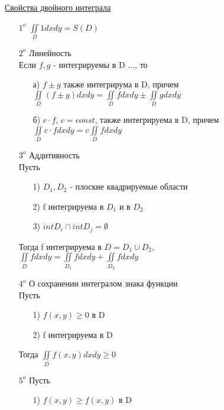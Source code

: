 \underline{Свойства двойного интеграла} \\
\begin{enumerate}
\item[$1^o$]
$\iint\limits_{D} 1 dxdy = S(D)$

\item[$2^o$] 
Линейность \\
Если $f,g$ - интегрируемы в D ..., то
	\begin{enumerate}
	\item[а)] 
	$f \pm g$ также интегрирума в D, причем \\
	$\iint\limits_{D} (f \pm g) dxdy = \iint\limits_{D} fdxdy \pm \iint\limits_{D} gdxdy$
	
	\item[б)]
	$c \cdot f$, $c = const$, также интегрируема в D, причем \\
	$\iint\limits_{D} c \cdot f dxdy = c \iint\limits_{D} f dxdy$
	\end{enumerate}
	
\item[$3^o$] 
Аддитивность \\
Пусть 
	\begin{enumerate}
	\item[1)] 
	$D_1, D_2$ - плоские квадрируемые области
	
	\item[2)]
	f интегрируема в $D_1$ и в $D_2$
	
	\item[3)]
	$int D_i \cap int D_j = \emptyset$
	\end{enumerate}
	
Тогда f интегрируема в $D = D_1 \cup D_2$, \\
$\iint\limits_{D} fdxdy = \iint\limits_{D_1} fdxdy + \iint\limits_{D_2} fdxdy$ 

\item[$4^o$] 
О сохранении интегралом знака функции \\
Пусть 
	\begin{enumerate}
	\item[1)]
	$f(x,y) \geqslant 0$ в D
	
	\item[2)]
	f интегрируема в D
	\end{enumerate}
 
Тогда $\iint\limits_{D} f(x,y) dxdy \geqslant 0$


\item[$5^o$]
Пусть
	\begin{enumerate}
	\item[1)] 
	$f(x,y) \geqslant f(x,y)$ в D
	

\end{enumerate}
\end{enumerate}
